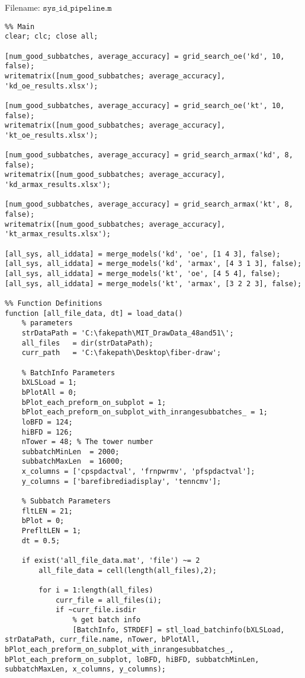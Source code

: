 Filename: $\texttt{sys\_id\_pipeline.m}$
\begin{lstlisting}
%% Main
clear; clc; close all;

[num_good_subbatches, average_accuracy] = grid_search_oe('kd', 10, false); 
writematrix([num_good_subbatches; average_accuracy], 'kd_oe_results.xlsx');

[num_good_subbatches, average_accuracy] = grid_search_oe('kt', 10, false);
writematrix([num_good_subbatches; average_accuracy], 'kt_oe_results.xlsx');

[num_good_subbatches, average_accuracy] = grid_search_armax('kd', 8, false); 
writematrix([num_good_subbatches; average_accuracy], 'kd_armax_results.xlsx');

[num_good_subbatches, average_accuracy] = grid_search_armax('kt', 8, false);
writematrix([num_good_subbatches; average_accuracy], 'kt_armax_results.xlsx');

[all_sys, all_iddata] = merge_models('kd', 'oe', [1 4 3], false);
[all_sys, all_iddata] = merge_models('kd', 'armax', [4 3 1 3], false);
[all_sys, all_iddata] = merge_models('kt', 'oe', [4 5 4], false);
[all_sys, all_iddata] = merge_models('kt', 'armax', [3 2 2 3], false);

%% Function Definitions
function [all_file_data, dt] = load_data()
    % parameters
    strDataPath = 'C:\fakepath\MIT_DrawData_48and51\';
    all_files   = dir(strDataPath);
    curr_path   = 'C:\fakepath\Desktop\fiber-draw';
    
    % BatchInfo Parameters
    bXLSLoad = 1;
    bPlotAll = 0;
    bPlot_each_preform_on_subplot = 1;
    bPlot_each_preform_on_subplot_with_inrangesubbatches_ = 1;
    loBFD = 124;
    hiBFD = 126;
    nTower = 48; % The tower number
    subbatchMinLen 	= 2000; 
    subbatchMaxLen  = 16000;
    x_columns = ['cpspdactval', 'frnpwrmv', 'pfspdactval'];
    y_columns = ['barefibrediadisplay', 'tenncmv'];
    
    % Subbatch Parameters
    fltLEN = 21;
    bPlot = 0; 
    PrefltLEN = 1;
    dt = 0.5;
    
    if exist('all_file_data.mat', 'file') ~= 2
        all_file_data = cell(length(all_files),2);
    
        for i = 1:length(all_files)
            curr_file = all_files(i);
            if ~curr_file.isdir
                % get batch info
                [BatchInfo, STRDEF] = stl_load_batchinfo(bXLSLoad, strDataPath, curr_file.name, nTower, bPlotAll, bPlot_each_preform_on_subplot_with_inrangesubbatches_, bPlot_each_preform_on_subplot, loBFD, hiBFD, subbatchMinLen, subbatchMaxLen, x_columns, y_columns);
    

\end{lstlisting}
